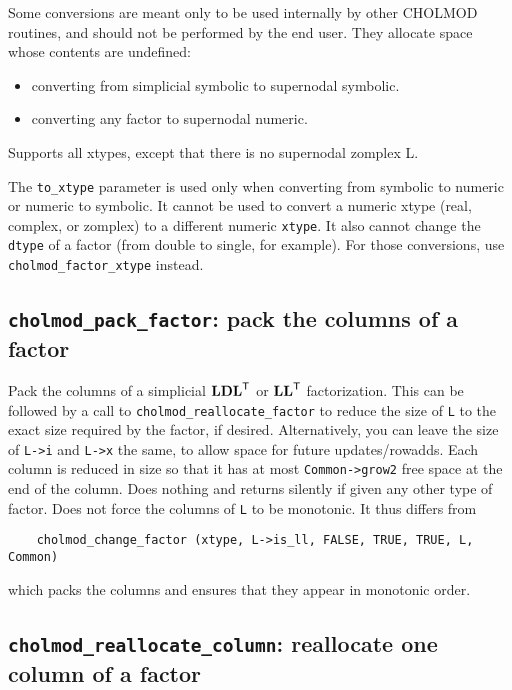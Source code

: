 \documentclass[11pt]{article}
\newcommand{\m}[1]{{\bf{#1}}}       %
\newcommand{\tr}{^{\sf T}}          %
\begin{document}
Some conversions are meant only to be used internally by other CHOLMOD
routines, and should not be performed by the end user.  They allocate space
whose contents are undefined:

\begin{itemize}
\item converting from simplicial symbolic to supernodal symbolic.
\item converting any factor to supernodal numeric.
\end{itemize}

Supports all xtypes, except that there is no supernodal zomplex L.

The \verb'to_xtype' parameter is used only when converting from symbolic to
numeric or numeric to symbolic.  It cannot be used to convert a numeric xtype
(real, complex, or zomplex) to a different numeric {\tt xtype}.  It also cannot
change the \verb'dtype' of a factor (from double to single, for example).
For those conversions, use \verb'cholmod_factor_xtype' instead.

\subsection{{\tt cholmod\_pack\_factor}: pack the columns of a factor}


Pack the columns of a simplicial $\m{LDL}\tr$ or $\m{LL}\tr$ factorization.
This can be followed by a call to {\tt cholmod\_reallocate\_factor} to reduce
the size of {\tt L} to the exact size required by the factor, if desired.
Alternatively, you can leave the size of {\tt L->i} and {\tt L->x} the same, to
allow space for future updates/rowadds.  Each column is reduced in size so that
it has at most {\tt Common->grow2} free space at the end of the column.  Does
nothing and returns silently if given any other type of factor.  Does not force
the columns of {\tt L} to be monotonic.  It thus differs from

\begin{verbatim}
    cholmod_change_factor (xtype, L->is_ll, FALSE, TRUE, TRUE, L, Common)
\end{verbatim}

which packs the columns and ensures that they appear in monotonic order.

\subsection{{\tt cholmod\_reallocate\_column}: reallocate one column of a
factor}
\end{document}
